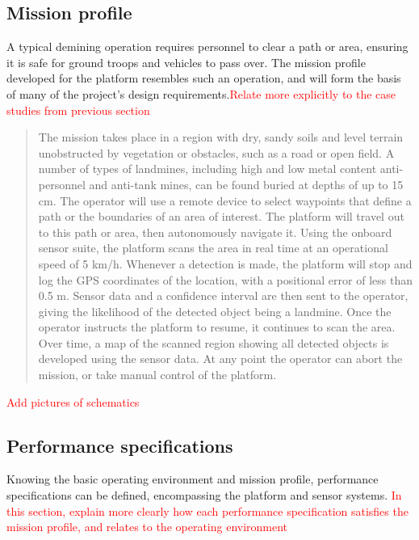 \documentclass[main.tex]{subfiles}
\begin{document}
\subsection{Mission profile}
A typical demining operation requires personnel to clear a path or area, ensuring it is safe for ground troops and vehicles to pass over. The mission profile developed for the platform resembles such an operation, and will form the basis of many of the project's design requirements.\textcolor{red}{Relate more explicitly to the case studies from previous section}
\begin{quote}The mission takes place in a region with dry, sandy soils and level terrain unobstructed by vegetation or obstacles, such as a road or open field. A number of types of landmines, including high and low metal content anti-personnel and anti-tank mines, can be found buried at depths of up to 15 cm. The operator will use a remote device to select waypoints that define a path or the boundaries of an area of interest. The platform will travel out to this path or area, then autonomously navigate it. Using the onboard sensor suite, the platform scans the area in real time at an operational speed of 5 km/h. Whenever a detection is made, the platform will stop and log the GPS coordinates of the location, with a positional error of less than 0.5 m. Sensor data and a confidence interval are then sent to the operator, giving the likelihood of the detected object being a landmine. Once the operator instructs the platform to resume, it continues to scan the area. Over time, a map of the scanned region showing all detected objects is developed using the sensor data. At any point the operator can abort the mission, or take manual control of the platform.
\end{quote}
\textcolor{red}{Add pictures of schematics}

\subsection{Performance specifications}
Knowing the basic operating environment and mission profile, performance specifications can be defined, encompassing the platform and sensor systems. \textcolor{red}{In this section, explain more clearly how each performance specification satisfies the mission profile, and relates to the operating environment}
\end{document}
